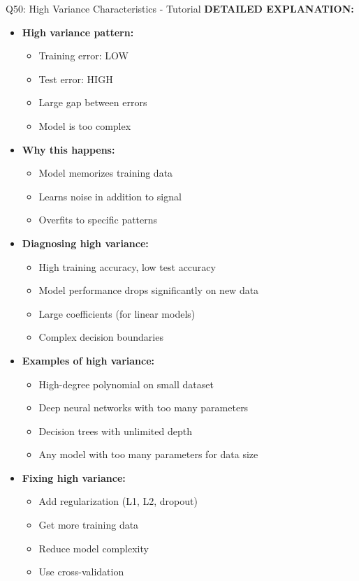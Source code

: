 \documentclass[8pt]{beamer}
\begin{document}
\begin{frame}{Q50: High Variance Characteristics - Tutorial}
		\vspace{0.05cm}
		\textbf{DETAILED EXPLANATION:}
		\begin{itemize}
			\item \textbf{High variance pattern:}
			\begin{itemize}
				\item Training error: LOW
				\item Test error: HIGH
				\item Large gap between errors
				\item Model is too complex
			\end{itemize}
			\item \textbf{Why this happens:}
			\begin{itemize}
				\item Model memorizes training data
				\item Learns noise in addition to signal
				\item Overfits to specific patterns
			\end{itemize}
			\item \textbf{Diagnosing high variance:}
			\begin{itemize}
				\item High training accuracy, low test accuracy
				\item Model performance drops significantly on new data
				\item Large coefficients (for linear models)
				\item Complex decision boundaries
			\end{itemize}
			\item \textbf{Examples of high variance:}
			\begin{itemize}
				\item High-degree polynomial on small dataset
				\item Deep neural networks with too many parameters
				\item Decision trees with unlimited depth
				\item Any model with too many parameters for data size
			\end{itemize}
			\item \textbf{Fixing high variance:}
			\begin{itemize}
				\item Add regularization (L1, L2, dropout)
				\item Get more training data
				\item Reduce model complexity
				\item Use cross-validation
			\end{itemize}
		\end{itemize}
		

\end{frame}
\end{document}
